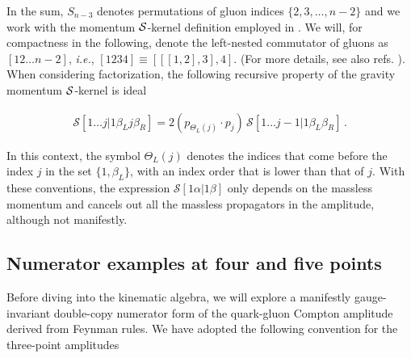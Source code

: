 \documentclass[a4paper,12pt]{article}
\def\Cdot{{\cdot}}
\begin{document}
In the sum, $S_{n\!-\!3}$ denotes permutations of gluon indices $\{2,3,\ldots, n\!-\!2\}$ and we work with the momentum ${\cal S}$-kernel definition employed in \cite{Brandhuber:2021bsf}. We will, for compactness in the following, denote the left-nested commutator of gluons as $[12\ldots n\!-\!2]$, {\it {\it i.e.}}, $[1234]\equiv[[[1,2],3],4]$. (For more details, see also refs. \cite{Carrasco:2016ldy,Frost:2020eoa}). When considering factorization, the following recursive property of the gravity momentum $\cal S$-kernel is ideal %

\begin{align}\label{Srec}
    \mathcal{S}[1\ldots j|1\beta_L j\beta_R]=2(p_{\Theta_L(j)}\Cdot p_j)\, \mathcal{S}[1\ldots j{-}1|1\beta_L \beta_R] \, .
\end{align}

In this context, the symbol $\Theta_L(j)$ denotes the indices that come before the index $j$ in the set $\{1, \beta_{L}\}$, with an index order that is lower than that of $j$. With these conventions, the expression $\mathcal{S}[1\alpha |1\beta]$ only depends on the massless momentum and cancels out all the massless propagators in the amplitude, although not manifestly. 

\subsection{Numerator examples at four and five points}
Before diving into the kinematic algebra, we will explore a manifestly gauge-invariant double-copy numerator form of the quark-gluon Compton amplitude derived from Feynman rules. We have adopted the following convention for the three-point amplitudes
\end{document}

